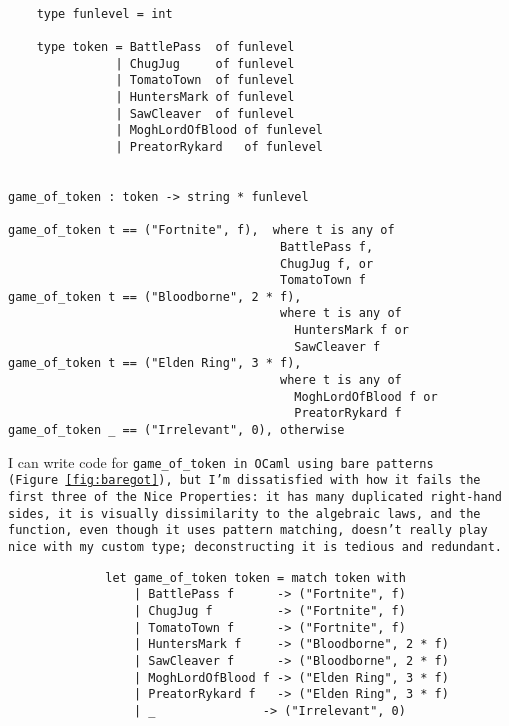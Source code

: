\documentclass[manuscript,screen,review, 12pt, nonacm]{acmart}
\begin{document}
\begin{outline}[enumerate]
\begin{minipage}[t]{\textwidth}
    \centering 
    \begin{verbatim}

    type funlevel = int

    type token = BattlePass  of funlevel 
               | ChugJug     of funlevel 
               | TomatoTown  of funlevel
               | HuntersMark of funlevel 
               | SawCleaver  of funlevel
               | MoghLordOfBlood of funlevel 
               | PreatorRykard   of funlevel
                   

game_of_token : token -> string * funlevel

game_of_token t == ("Fortnite", f),  where t is any of 
                                      BattlePass f, 
                                      ChugJug f, or
                                      TomatoTown f
game_of_token t == ("Bloodborne", 2 * f), 
                                      where t is any of 
                                        HuntersMark f or 
                                        SawCleaver f
game_of_token t == ("Elden Ring", 3 * f), 
                                      where t is any of 
                                        MoghLordOfBlood f or  
                                        PreatorRykard f
game_of_token _ == ("Irrelevant", 0), otherwise
    \end{verbatim}
\end{minipage}        
        
        I can write code for \tt{game\_of\_token} in OCaml using bare patterns
        (Figure~\ref{fig:baregot}), but I'm dissatisfied with how it fails the
        first three of the Nice Properties: it has many duplicated right-hand
        sides, it is visually dissimilarity to the algebraic laws, and the
        function, even though it uses pattern matching, doesn't really play nice
        with my custom type; deconstructing it is tedious and redundant.         
        
        \begin{figure}
            \begin{center}
                \begin{verbatim}
        let game_of_token token = match token with 
            | BattlePass f      -> ("Fortnite", f)
            | ChugJug f         -> ("Fortnite", f)
            | TomatoTown f      -> ("Fortnite", f)
            | HuntersMark f     -> ("Bloodborne", 2 * f)
            | SawCleaver f      -> ("Bloodborne", 2 * f)
            | MoghLordOfBlood f -> ("Elden Ring", 3 * f)
            | PreatorRykard f   -> ("Elden Ring", 3 * f)
            | _               -> ("Irrelevant", 0)
                \end{verbatim}
            \end{center}    


\end{figure}
\end{outline}
\end{document}
